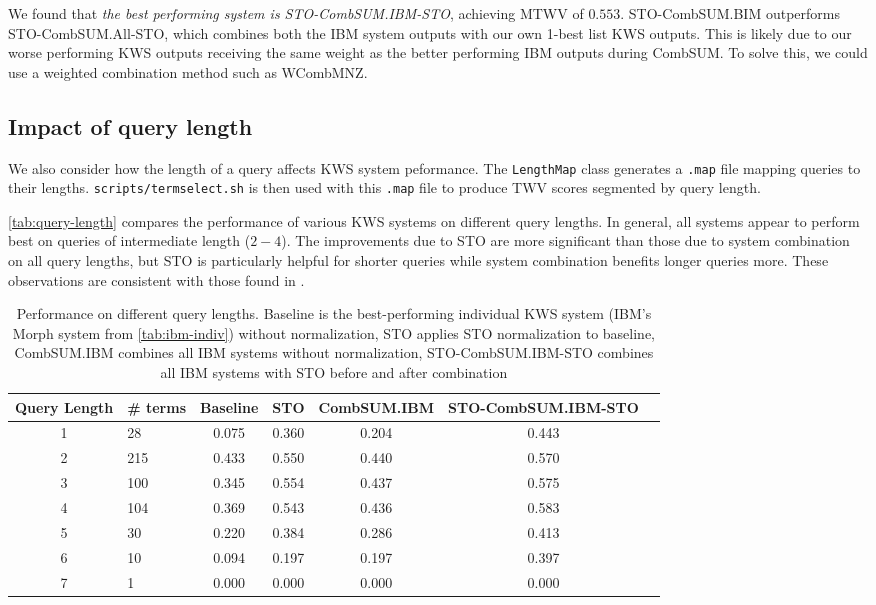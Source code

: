 \documentclass[a4paper,oneside,reqno]{amsart}
\begin{document}
We found that \emph{the best performing system is STO-CombSUM.IBM-STO}, achieving
MTWV of $0.553$. STO-CombSUM.BIM outperforms STO-CombSUM.All-STO, which combines
both the IBM system outputs with our own 1-best list KWS outputs. This is likely due
to our worse performing KWS outputs receiving the same weight as the better
performing IBM outputs during CombSUM. To solve this, we could use a weighted
combination method such as WCombMNZ\cite{mamou2013system}.

\subsection{Impact of query length}

We also consider how the length of a query affects KWS system peformance. The
\texttt{LengthMap} class generates a \texttt{.map} file mapping queries to
their lengths.  \texttt{scripts/termselect.sh} is then used with this
\texttt{.map} file to produce TWV scores segmented by query length.

\autoref{tab:query-length} compares the performance of various KWS systems on
different query lengths. In general, all systems appear to perform best on
queries of intermediate length ($2-4$). The improvements due to STO are more
significant than those due to system combination on all query lengths, but STO
is particularly helpful for shorter queries while system combination benefits
longer queries more. These observations are consistent with those found in
\cite{mamou2013system}.

\begin{table}[ht!]
  \begin{tabular}{clccccc}
    \toprule
    Query Length & \# terms & Baseline & STO & CombSUM.IBM & STO-CombSUM.IBM-STO \\ %
    \midrule
    1 & 28  & 0.075 & 0.360 & 0.204 & 0.443 \\
    2 & 215 & 0.433 & 0.550 & 0.440 & 0.570 \\
    3 & 100 & 0.345 & 0.554 & 0.437 & 0.575 \\
    4 & 104 & 0.369 & 0.543 & 0.436 & 0.583 \\
    5 & 30  & 0.220 & 0.384 & 0.286 & 0.413 \\
    6 & 10  & 0.094 & 0.197 & 0.197 & 0.397 \\
    7 & 1   & 0.000 & 0.000 & 0.000 & 0.000 \\
    \bottomrule
  \end{tabular}
  \caption{Performance on different query lengths. Baseline is the
  best-performing individual KWS system (IBM's Morph system from
  \autoref{tab:ibm-indiv}) without normalization,  STO applies STO
  normalization to baseline, CombSUM.IBM combines all IBM systems without
  normalization, STO-CombSUM.IBM-STO combines all IBM systems with STO before
  and after combination}
  \label{tab:query-length}
\end{table}
\end{document}
